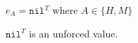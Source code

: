 \begin{case}

$e_{A}=\mathtt{nil}^{T}$ where $A\in\lbrace H,M\rbrace$

$\mathtt{nil}^{T}$ is an unforced value.

\end{case}